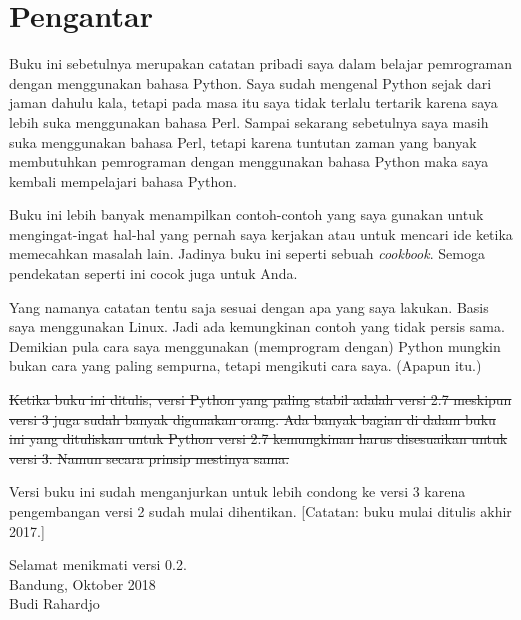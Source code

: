 \chapter*{Pengantar}
Buku ini sebetulnya merupakan catatan pribadi saya dalam belajar pemrograman
dengan menggunakan bahasa Python. Saya sudah mengenal Python sejak dari jaman
dahulu kala, tetapi pada masa itu saya tidak terlalu tertarik karena saya lebih
suka menggunakan bahasa Perl. Sampai sekarang sebetulnya saya masih suka
menggunakan bahasa Perl, tetapi karena tuntutan zaman yang banyak membutuhkan
pemrograman dengan menggunakan bahasa Python maka saya kembali mempelajari
bahasa Python.

Buku ini lebih banyak menampilkan contoh-contoh yang saya gunakan untuk
mengingat-ingat hal-hal yang pernah saya kerjakan atau untuk mencari ide ketika
memecahkan masalah lain. Jadinya buku ini seperti sebuah {\em cookbook}. Semoga
pendekatan seperti ini cocok juga untuk Anda.

Yang namanya catatan tentu saja sesuai dengan apa yang saya lakukan. Basis saya
menggunakan Linux. Jadi ada kemungkinan contoh yang tidak persis sama. Demikian
pula cara saya menggunakan (memprogram dengan) Python mungkin bukan cara yang
paling sempurna, tetapi mengikuti cara saya. (Apapun itu.)

\st{Ketika buku ini ditulis, versi Python yang paling stabil adalah versi 2.7
meskipun versi 3 juga sudah banyak digunakan orang. Ada banyak bagian di dalam
buku ini yang dituliskan untuk Python versi 2.7 kemungkinan harus disesuaikan
untuk versi 3. Namun secara prinsip mestinya sama.} 

Versi buku ini sudah menganjurkan untuk lebih condong ke versi 3
karena pengembangan versi 2 sudah mulai dihentikan.
[Catatan: buku mulai ditulis akhir 2017.]


Selamat menikmati versi 0.2.\\
Bandung, Oktober 2018\\
Budi Rahardjo
